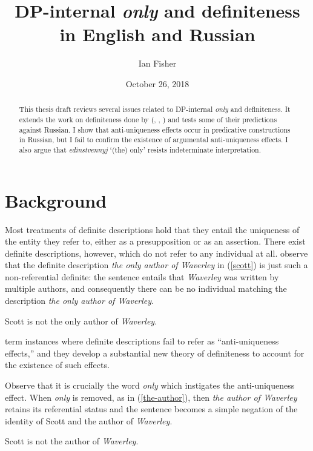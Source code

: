 \documentclass{article}
\title{DP-internal \textit{only} and definiteness in English and Russian}
\author{Ian Fisher}
\date{October 26, 2018}
\begin{document}
\maketitle


\begin{abstract}

This thesis draft reviews several issues related to DP-internal \textit{only} and definiteness. It extends the work on definiteness done by \citeauthor{cb2015} (\citeyear{cb2012a}, \citeyear{cb2012b}, \citeyear{cb2015}) and tests some of their predictions against Russian. I show that anti-uniqueness effects occur in predicative constructions in Russian, but I fail to confirm the existence of argumental anti-uniqueness effects. I also argue that \textit{edinstvennyj} `(the) only' resists indeterminate interpretation.
\end{abstract}


\section{Background}
Most treatments of definite descriptions hold that they entail the uniqueness of the entity they refer to, either as a presupposition or as an assertion. There exist definite descriptions, however, which do not refer to any individual at all. \citet{cb2015} observe that the definite description \textit{the only author of Waverley} in (\ref{scott}) is just such a non-referential definite: the sentence entails that \textit{Waverley} was written by multiple authors, and consequently there can be no individual matching the description \textit{the only author of Waverley}.

\begin{exe}
	\ex \label{scott} Scott is not the only author of \textit{Waverley}.
\end{exe}

\citeauthor{cb2015} term instances where definite descriptions fail to refer as ``anti-uniqueness effects,'' and they develop a substantial new theory of definiteness to account for the existence of such effects.

Observe that it is crucially the word \textit{only} which instigates the anti-uniqueness effect. When \textit{only} is removed, as in (\ref{the-author}), then \textit{the author of Waverley} retains its referential status and the sentence becomes a simple negation of the identity of Scott and the author of \textit{Waverley}.

\begin{exe}
	\ex \label{the-author} Scott is not the author of \textit{Waverley}.
\end{exe}
\end{document}
